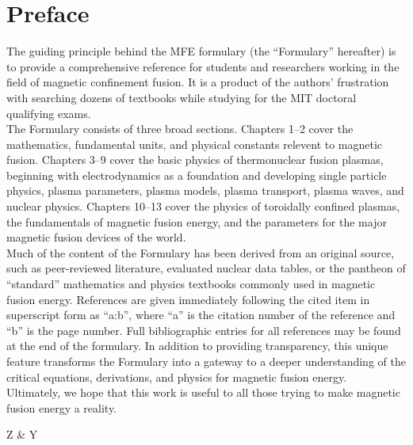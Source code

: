 \chapter*{Preface}
\noindent
The guiding principle behind the MFE formulary (the ``Formulary''
hereafter) is to provide a comprehensive reference for students and
researchers working in the field of magnetic confinement fusion. It is
a product of the authors' frustration with searching dozens of
textbooks while studying for the MIT doctoral qualifying exams.\\

\noindent
The Formulary consists of three broad sections. Chapters 1--2 cover
the mathematics, fundamental units, and physical constants relevent to
magnetic fusion. Chapters 3--9 cover the basic physics of
thermonuclear fusion plasmas, beginning with electrodynamics as a
foundation and developing single particle physics, plasma parameters,
plasma models, plasma transport, plasma waves, and nuclear
physics. Chapters 10--13 cover the physics of toroidally confined
plasmas, the fundamentals of magnetic fusion energy, and the
parameters for the major magnetic fusion devices of the world.\\

\noindent
Much of the content of the Formulary has been derived from an original
source, such as peer-reviewed literature, evaluated nuclear data
tables, or the pantheon of ``standard'' mathematics and physics
textbooks commonly used in magnetic fusion energy. References are
given immediately following the cited item in superscript form as
``a:b'', where ``a'' is the citation number of the reference and ``b''
is the page number. Full bibliographic entries for all references may
be found at the end of the formulary. In addition to providing
transparency, this unique feature transforms the Formulary into a
gateway to a deeper understanding of the critical equations,
derivations, and physics for magnetic fusion energy. \\


\noindent
Ultimately, we hope that this work is useful to all those trying to
make magnetic fusion energy a reality.\\
\begin{center}
Z \& Y
\end{center}
\vfill
\pagebreak

